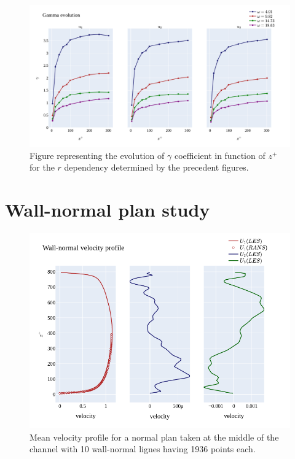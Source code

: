 \documentclass[]{article}
\theoremstyle{plain}
\theoremstyle{remark}
\begin{document}
\begin{figure}[h!]
	\begin{center}
		\includegraphics[width=\textwidth]{../output/channel_wrles_retau395/split_time/gamma/gamma_view_r_all.png}
		\caption{Figure representing the evolution of $\gamma$ coefficient in function of $z^+$ for the $r$ dependency determined by the precedent figures. }
	\end{center}
\end{figure}

\section{Wall-normal plan study}

\begin{figure}[h!]
	\begin{center}
		\includegraphics[width=\textwidth]{../output/channel_wrles_retau395/Normal_plan/velocity_profiles.png}
		\caption{Mean velocity profile for a normal plan taken at the middle of the channel with 10 wall-normal lignes having 1936 points each.}
	\end{center}
\end{figure}
\end{document}
